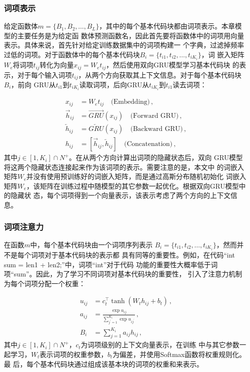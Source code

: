 \subsubsection{词项表示}
给定函数体$m=\{B_1,B_2,\dots,B_L\}$，其中的每个基本代码块都由词项表示。本章模型的主要任务是为给定函
数体预测函数名，因此首先要将函数体中的词项用向量表示。具体来说，首先针对给定训练数据集中的词项构建一
个字典，过滤掉频率过低的词项。对于函数体中的每个基本代码块$B_i=\{t_{i1},t_{i2},\dots,t_{iK_i}\}$，词
嵌入矩阵$W_e$将词项$t_{ij}$转化为向量$x_{ij}=W_e t_{ij}$，然后使用双向GRU模型学习基本代码块
的表示，对于每个输入词项$t_{ij}$，从两个方向获取其上下文信息。对于每个基本代码块$B_i$，前向
GRU从$t_{i1}$到$t_{iK_i}$读取词项，后向GRU从$t_{iK_i}$到$t_{i1}$读去词项：

\begin{align}
	x_{ij} &= W_e t_{ij} \quad\text{(Embedding)} \,, \\
	\overrightarrow{h}_{ij} &= \overrightarrow{GRU}(x_{ij}) 
	\quad\text{(Forward GRU)} \,, \\
       \overleftarrow{h}_{ij} &= \overleftarrow{GRU}(x_{ij}) 
       \quad\text{(Backward GRU)} \,, \\
       h_{ij} &= [\overrightarrow{h}_{ij}, \overleftarrow{h}_{ij}] 
       \quad\text{(Concatenation)} \,,
\label{eq:token_encoder}
\end{align}
其中$j\in [1, K_i] \cap N^+$。在从两个方向计算出词项的隐藏状态后，双向
GRU模型将这两个隐藏状态连接起来作为该词项的表示。需要注意的是，本文中
的词嵌入矩阵$W_e$并没有使用预训练好的词嵌入矩阵，而是通过高斯分布随机初始化
词嵌入矩阵$W_e$，该矩阵在训练过程中随模型的其它参数一起优化。根据双向GRU模型中的隐藏状
态，每个词项得到一个向量表示，该表示考虑了两个方向的上下文信息。

\subsubsection{词项注意力}
在函数$m$中，每个基本代码块由一个词项序列表示
$B_i=\{t_{i1},t_{i2},\dots,t_{iK_i}\}$，然而并不是每个词项对于基本代码块的表示都
具有同等的重要性。例如，在代码``int sum = len1 + len2;''中，词项``int''对于代码
功能的重要性大概率低于词项``sum''。因此，为了学习不同词项对基本代码块的重要性，
引入了注意力机制为每个词项分配一个权重：

\begin{align}
    u_{ij} &= c_t^\top \tanh(W_t h_{ij} + b_t) \,, \\
    a_{ij} &= \frac{\exp{u_{ij}}}{\sum_{j^\prime=1}^{K_i} \exp{u_{ij^\prime}}} 
    \,, \\
    B_{i} &= \sum_{j=1}^{K_i} a_{ij}h_{ij} \,,
\label{eq:token_attn}
\end{align}
其中$j\in [1, K_i] \cap N^+$，$c_t$为词项级别的上下文向量表示，在训练
中与其它参数一起学习，$W_t$表示词项的权重参数，$b_t$为偏差，并使用Softmax函数将权重规则化。最
后，每个基本代码块通过组成该基本块的词项的权重和来表示。

